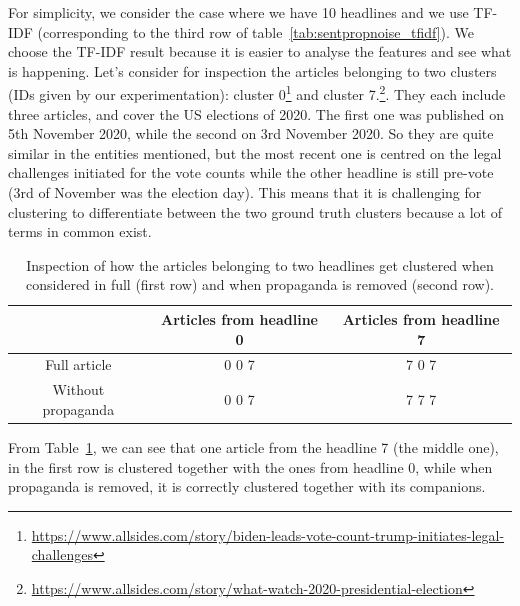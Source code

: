 For simplicity, we consider the case where we have 10 headlines and we use TF-IDF (corresponding to the third row of table~\ref{tab:sentpropnoise_tfidf}). We choose the TF-IDF result because it is easier to analyse the features and see what is happening.
Let’s consider for inspection the articles belonging to two clusters (IDs given by our experimentation): cluster 0\footnote{\url{https://www.allsides.com/story/biden-leads-vote-count-trump-initiates-legal-challenges}} and cluster 7.\footnote{\url{https://www.allsides.com/story/what-watch-2020-presidential-election}}. They each include three articles, and cover the US elections of 2020. The first one was published on 5th November 2020, while the second on 3rd November 2020. So they are quite similar in the entities mentioned, but the most recent one is centred on the legal challenges initiated for the vote counts while the other headline is still pre-vote (3rd of November was the election day). This means that it is challenging for clustering to differentiate between the two ground truth clusters because a lot of terms in common exist.

\begin{table}[!htbp]
    \centering
    \begin{tabular}{c|c|c}
         & Articles from headline 0 & Articles from headline 7 \\
         \hline
        Full article & 0 0 7 & 7 0 7 \\
        Without propaganda & 0 0 7 & 7 7 7
    \end{tabular}
    \caption{Inspection of how the articles belonging to two headlines get clustered when considered in full (first row) and when propaganda is removed (second row).}
    \label{tab:sentpropnoise_inspection}
\end{table}



From Table~\ref{tab:sentpropnoise_inspection}, we can see that one article from the headline 7 (the middle one), in the first row is clustered together with the ones from headline 0, while when propaganda is removed, it is correctly clustered together with its companions.

